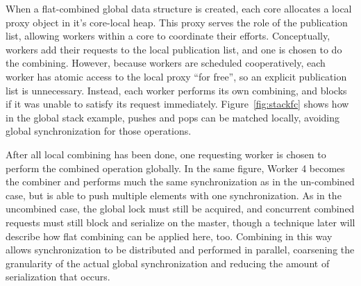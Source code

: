 When a flat-combined global data structure is created, each core allocates a local proxy object in it's core-local heap. This proxy serves the role of the publication list, allowing workers within a core to coordinate their efforts. 
Conceptually, workers add their requests to the local publication list, and one is chosen to do the combining. However, because workers are scheduled cooperatively, each worker has atomic access to the local proxy ``for free'', so an explicit publication list is unnecessary.
Instead, each worker performs its own combining, and blocks if it was unable to satisfy its request immediately. Figure~\ref{fig:stackfc} shows how in the global stack example, pushes and pops can be matched locally, avoiding global synchronization for those operations.

After all local combining has been done, one requesting worker is chosen to perform the combined operation globally. In the same figure, Worker 4 becomes the combiner and performs much the same synchronization as in the un-combined case, but is able to push multiple elements with one synchronization. As in the uncombined case, the global lock must still be acquired, and concurrent combined requests must still block and serialize on the master, though a technique later will describe how flat combining can be applied here, too. Combining in this way allows synchronization to be distributed and performed in parallel, coarsening the granularity of the actual global synchronization and reducing the amount of serialization that occurs.



